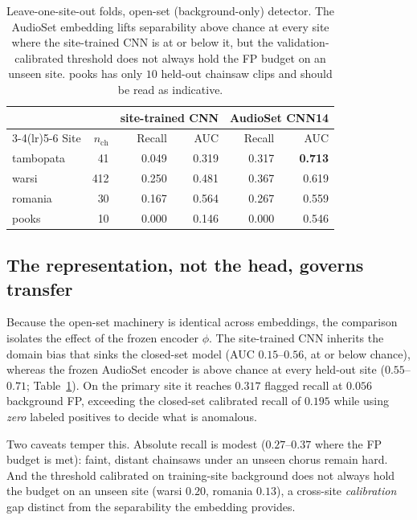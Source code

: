 \begin{table}[t]
\centering
\caption{Leave-one-site-out folds, open-set (background-only) detector.
The AudioSet embedding lifts separability above chance at every site where the
site-trained CNN is at or below it, but the validation-calibrated threshold does
not always hold the FP budget on an unseen site. pooks has only $10$ held-out
chainsaw clips and should be read as indicative.}
\label{tab:folds}
\small\setlength{\tabcolsep}{4pt}
\begin{tabular}{lrrrrr}
\toprule
& & \multicolumn{2}{c}{site-trained CNN} & \multicolumn{2}{c}{AudioSet CNN14} \\
\cmidrule(lr){3-4}\cmidrule(lr){5-6}
Site & $n_{\text{ch}}$ & Recall & AUC & Recall & AUC \\
\midrule
tambopata & 41  & 0.049 & 0.319 & 0.317 & \textbf{0.713} \\
warsi     & 412 & 0.250 & 0.481 & 0.367 & 0.619 \\
romania   & 30  & 0.167 & 0.564 & 0.267 & 0.559 \\
pooks     & 10  & 0.000 & 0.146 & 0.000 & 0.546 \\
\bottomrule
\end{tabular}
\end{table}

\subsection{The representation, not the head, governs transfer}

Because the open-set machinery is identical across embeddings, the comparison
isolates the effect of the frozen encoder $\phi$. The site-trained CNN inherits
the domain bias that sinks the closed-set model (AUC $0.15$--$0.56$, at or below
chance), whereas the frozen AudioSet encoder is above chance at every held-out
site ($0.55$--$0.71$; Table~\ref{tab:folds}). On the primary site it reaches
$0.317$ flagged recall at $0.056$ background FP, exceeding the closed-set
calibrated recall of $0.195$ while using \emph{zero} labeled positives to decide
what is anomalous.

Two caveats temper this. Absolute recall is modest ($0.27$--$0.37$ where the FP
budget is met): faint, distant chainsaws under an unseen chorus remain hard.
And the threshold calibrated on training-site background does not always hold the
budget on an unseen site (warsi $0.20$, romania $0.13$), a cross-site
\emph{calibration} gap distinct from the separability the embedding provides.

